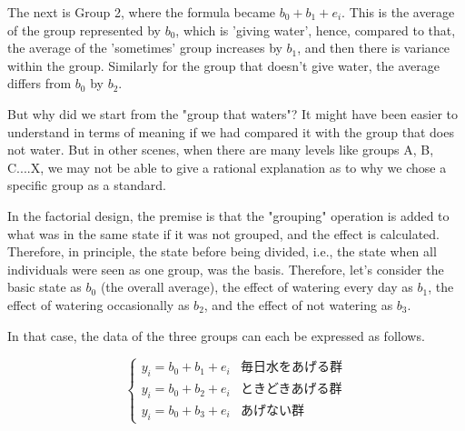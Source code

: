 \documentclass{ltjbook}
\begin{document}
The next is Group 2, where the formula became $b_0 + b_1 + e_i$. This is the average of the group represented by $b_0$, which is 'giving water', hence, compared to that, the average of the 'sometimes' group increases by $b_1$, and then there is variance within the group. Similarly for the group that doesn't give water, the average differs from $b_0$ by $b_2$.

But why did we start from the "group that waters"? It might have been easier to understand in terms of meaning if we had compared it with the group that does not water. But in other scenes, when there are many levels like groups A, B, C....X, we may not be able to give a rational explanation as to why we chose a specific group as a standard.

In the factorial design, the premise is that the "grouping" operation is added to what was in the same state if it was not grouped, and the effect is calculated. Therefore, in principle, the state before being divided, i.e., the state when all individuals were seen as one group, was the basis.
Therefore, let's consider the basic state as $b_0$ (the overall average), the effect of watering every day as $b_1$, the effect of watering occasionally as $b_2$, and the effect of not watering as $b_3$.

In that case, the data of the three groups can each be expressed as follows.

\[
	\label{eq13_01}
	\begin{cases}
		y_{i} = b_0 + b_1 + e_{i} & \mbox{毎日水をあげる群} \\
		y_{i} = b_0 + b_2 + e_{i} & \mbox{ときどきあげる群} \\
		y_{i} = b_0 + b_3 + e_{i} & \mbox{あげない群}
	\end{cases}
\]
\end{document}
